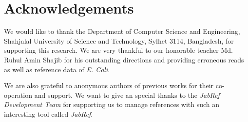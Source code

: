 \documentclass{standalone}
\begin{document}
\chapter*{Acknowledgements}
We would like to thank the Department of Computer Science and Engineering, Shahjalal University of Science and
Technology, Sylhet 3114, Bangladesh, for supporting this research. We are very thankful to our honorable teacher Md. Ruhul Amin Shajib for his outstanding directions and providing erroneous reads as well as reference data of  \emph{E. Coli}.  

We are also grateful to
anonymous authors of previous works for their co-operation and support.
We want to give an special thanks to the \emph{JabRef Development Team} for supporting us to manage references with such an interesting tool called \emph{JabRef}\cite{JabRef_software}.
\end{document}
